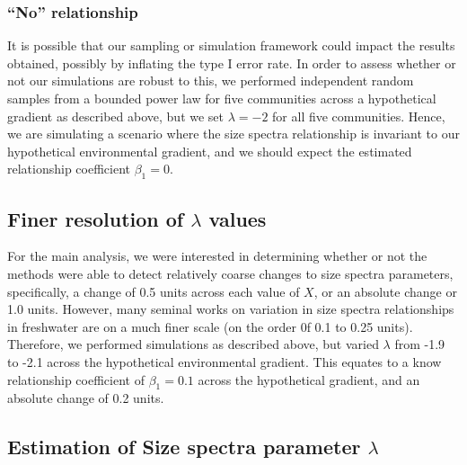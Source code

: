 \documentclass[
]{article}
\begin{document}
\hypertarget{no-relationship}{%
\subsubsection{``No'' relationship}\label{no-relationship}}

It is possible that our sampling or simulation framework could impact
the results obtained, possibly by inflating the type I error rate. In
order to assess whether or not our simulations are robust to this, we
performed independent random samples from a bounded power law for five
communities across a hypothetical gradient as described above, but we
set \(\lambda = -2\) for all five communities. Hence, we are simulating
a scenario where the size spectra relationship is invariant to our
hypothetical environmental gradient, and we should expect the estimated
relationship coefficient \(\beta_1 = 0\).

\hypertarget{finer-resolution-of-lambda-values}{%
\subsection{\texorpdfstring{Finer resolution of \(\lambda\)
values}{Finer resolution of \textbackslash lambda values}}\label{finer-resolution-of-lambda-values}}

For the main analysis, we were interested in determining whether or not
the methods were able to detect relatively coarse changes to size
spectra parameters, specifically, a change of 0.5 units across each
value of \(X\), or an absolute change or 1.0 units. However, many
seminal works on variation in size spectra relationships in freshwater
are on a much finer scale (on the order 0f 0.1 to 0.25 units).
Therefore, we performed simulations as described above, but varied
\(\lambda\) from -1.9 to -2.1 across the hypothetical environmental
gradient. This equates to a know relationship coefficient of
\(\beta_1 = 0.1\) across the hypothetical gradient, and an absolute
change of 0.2 units.

\hypertarget{estimation-of-size-spectra-parameter-lambda}{%
\subsection{\texorpdfstring{Estimation of Size spectra parameter
\(\lambda\)}{Estimation of Size spectra parameter \textbackslash lambda}}\label{estimation-of-size-spectra-parameter-lambda}}
\end{document}
